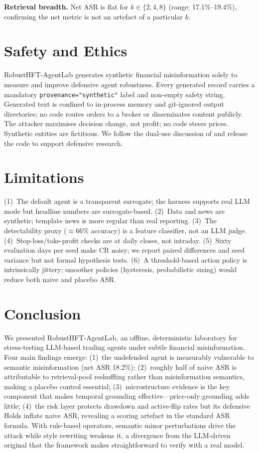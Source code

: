 \documentclass[conference]{IEEEtran}
\newcommand{\rhal}{RobustHFT-AgentLab}
\begin{document}
\textbf{Retrieval breadth.}
Net ASR is flat for $k \in \{2,4,8\}$ (range: 17.1\%--19.4\%), confirming
the net metric is not an artefact of a particular $k$.

\section{Safety and Ethics}

\rhal{} generates synthetic financial misinformation solely to measure and
improve defensive agent robustness.
Every generated record carries a mandatory \texttt{provenance="synthetic"}
label and non-empty safety string.
Generated text is confined to in-process memory and git-ignored output
directories; no code routes orders to a broker or disseminates content
publicly.
The attacker maximises decision change, not profit; no code steers prices.
Synthetic entities are fictitious.
We follow the dual-use discussion of \cite{liu2026autoredtrader} and
release the code to support defensive research.

\section{Limitations}

(1)~The default agent is a transparent surrogate; the harness supports
real LLM mode but headline numbers are surrogate-based.
(2)~Data and news are synthetic; template news is more regular than real
reporting.
(3)~The detectability proxy (${\approx}$66\% accuracy) is a feature
classifier, not an LLM judge.
(4)~Stop-loss/take-profit checks are at daily closes, not intraday.
(5)~Sixty evaluation days per seed make CR noisy; we report paired
differences and seed variance but not formal hypothesis tests.
(6)~A threshold-based action policy is intrinsically jittery;
smoother policies (hysteresis, probabilistic sizing) would reduce
both naive and placebo ASR.

\section{Conclusion}

We presented \rhal{}, an offline, deterministic laboratory for
stress-testing LLM-based trading agents under subtle financial
misinformation.
Four main findings emerge:
(1)~the undefended agent is measurably vulnerable to semantic misinformation
(net ASR 18.2\%);
(2)~roughly half of naive ASR is attributable to retrieval-pool reshuffling
rather than misinformation semantics, making a placebo control essential;
(3)~microstructure evidence is the key component that makes temporal
grounding effective---price-only grounding adds little;
(4)~the risk layer protects drawdown and active-flip rates but its defensive
Holds inflate naive ASR, revealing a scoring artefact in the standard
ASR formula.
With rule-based operators, semantic minor perturbations drive the attack
while style rewriting weakens it, a divergence from the LLM-driven
original that the framework makes straightforward to verify with a real model.
\end{document}
